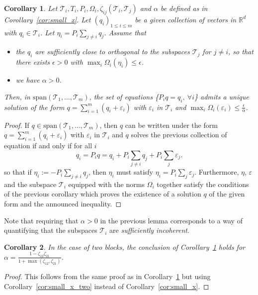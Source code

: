 \documentclass{article}
\def\BIT{\begin{itemize}}
\def\EIT{\end{itemize}}
\def\RR{\mathbb{R}}
\def\ej{\varepsilon_j}
\def\T{\mathcal{T}}
\def\xxi{\zeta}
\newtheorem{cor}{Corollary}
\begin{document}
\begin{cor}
\label{cor:main}
Let $\T_i,T_i,P_i,\Omega_i, \xxi_{ij}(\T_i,\T_j)$ and $\alpha$ be defined as in Corollary~\ref{cor:small_x}. Let $(q_i)_{1\leq i \leq m}$ be a given collection of vectors in $\RR^d$ with $q_i \in \T_i$. 
Let $\eta_i=P_i \sum_{j \neq i} q_j$.
Assume that
\BIT
\item the $q_i$ are sufficiently close to orthogonal to the subspaces $\T_j$ for $j \neq i$, so that there exists $\epsilon>0$ with $\max_{i} \Omega_i(\eta_i) \leq \epsilon$.
\item we have $\alpha>0$.
\EIT
Then,  in $\text{span}(\T_1,\ldots,\T_m)$, the set of equations \{$P_i q=q_i, \: \forall i$\} admits a unique solution of the form $q=\sum_{i=1}^m (q_i+\varepsilon_i)$ with $\varepsilon_i$ in $\T_i$ and $\max_i\Omega_i(\varepsilon_i) \leq  \frac{\epsilon}{\alpha}$.
\end{cor}
\begin{proof}
If $q \in \text{span}(\T_1,\ldots,\T_m)$, then $q$ can be written under the form $q=\sum_{i=1}^m (q_i+\varepsilon_i)$ with $\varepsilon_i$ in $\T_i$ and $q$ solves the previous collection of equation if and only if for all $i$
$$q_i=P_i q=q_i +P_i \sum_{j \neq i} q_j+ P_i \sum_{j} \ej.$$
so that if $\eta_i:=-P_i \sum_{j \neq i} q_j$, then $\eta_i$ must satisfy $\eta_i= P_i \sum_{j} \ej$. Furthermore, $\eta$, $\varepsilon$ and the subspace $\T_i$ equipped with the norms $\Omega_i$ together satisfy the conditions of the previous corollary which proves the existence of a solution $q$ of the given form and the announced inequality.
\end{proof}

Note that requiring that $\alpha>0$ in the previous lemma corresponds to a way of quantifying that the subspaces $\T_i$ are \emph{sufficiently incoherent}.

\begin{cor}
\label{car:main_two}
In the case of two blocks, the conclusion of Corollary~\ref{cor:main} holds for $\alpha=\frac{1-\xxi_{12}\xxi_{21}}{1+\max(\xxi_{12},\xxi_{21})}$.
\end{cor}
\begin{proof}
This follows from the same proof as in Corollary~\ref{cor:main} but using Corollary~\ref{cor:small_x_two} instead of Corollary~\ref{cor:small_x}.
\end{proof}
\end{document}
